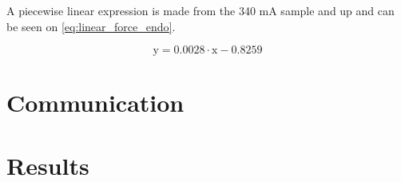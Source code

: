 \documentclass[conference]{IEEEtran}
\begin{document}
A piecewise linear expression is made from the 340 mA sample and up and can be seen on \eqref{eq:linear_force_endo}.

\begin{equation}
\text{y} = 0.0028 \cdot \text{x} -0.8259 
\label{eq:linear_force_endo}
\end{equation} 
\section{Communication}
\section{Results}
%
%



%
%
\end{document}
